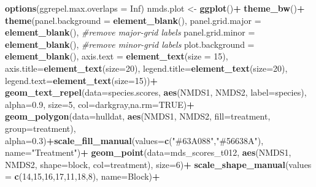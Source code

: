 \documentclass[
]{article}
\newenvironment{Shaded}{\begin{snugshade}}{\end{snugshade}}
\newcommand{\AttributeTok}[1]{\textcolor[rgb]{0.13,0.29,0.53}{#1}}
\newcommand{\CommentTok}[1]{\textcolor[rgb]{0.56,0.35,0.01}{\textit{#1}}}
\newcommand{\ConstantTok}[1]{\textcolor[rgb]{0.56,0.35,0.01}{#1}}
\newcommand{\DecValTok}[1]{\textcolor[rgb]{0.00,0.00,0.81}{#1}}
\newcommand{\FloatTok}[1]{\textcolor[rgb]{0.00,0.00,0.81}{#1}}
\newcommand{\FunctionTok}[1]{\textcolor[rgb]{0.13,0.29,0.53}{\textbf{#1}}}
\newcommand{\NormalTok}[1]{#1}
\newcommand{\OtherTok}[1]{\textcolor[rgb]{0.56,0.35,0.01}{#1}}
\newcommand{\SpecialCharTok}[1]{\textcolor[rgb]{0.81,0.36,0.00}{\textbf{#1}}}
\newcommand{\StringTok}[1]{\textcolor[rgb]{0.31,0.60,0.02}{#1}}
\begin{document}
\begin{Shaded}
\begin{Highlighting}[]
\FunctionTok{options}\NormalTok{(}\AttributeTok{ggrepel.max.overlaps =} \ConstantTok{Inf}\NormalTok{)}
\NormalTok{nmds.plot }\OtherTok{\textless{}{-}} \FunctionTok{ggplot}\NormalTok{()}\SpecialCharTok{+}
  \FunctionTok{theme\_bw}\NormalTok{()}\SpecialCharTok{+}
  \FunctionTok{theme}\NormalTok{(}\AttributeTok{panel.background =} \FunctionTok{element\_blank}\NormalTok{(),}
        \AttributeTok{panel.grid.major =} \FunctionTok{element\_blank}\NormalTok{(),  }\CommentTok{\#remove major{-}grid labels}
        \AttributeTok{panel.grid.minor =} \FunctionTok{element\_blank}\NormalTok{(),  }\CommentTok{\#remove minor{-}grid labels}
        \AttributeTok{plot.background =} \FunctionTok{element\_blank}\NormalTok{(), }
        \AttributeTok{axis.text =} \FunctionTok{element\_text}\NormalTok{(}\AttributeTok{size =} \DecValTok{15}\NormalTok{),}
        \AttributeTok{axis.title=}\FunctionTok{element\_text}\NormalTok{(}\AttributeTok{size=}\DecValTok{20}\NormalTok{),}
        \AttributeTok{legend.title=}\FunctionTok{element\_text}\NormalTok{(}\AttributeTok{size=}\DecValTok{20}\NormalTok{), }
        \AttributeTok{legend.text=}\FunctionTok{element\_text}\NormalTok{(}\AttributeTok{size=}\DecValTok{15}\NormalTok{))}\SpecialCharTok{+}
  \FunctionTok{geom\_text\_repel}\NormalTok{(}\AttributeTok{data=}\NormalTok{species.scores, }\FunctionTok{aes}\NormalTok{(NMDS1, NMDS2, }\AttributeTok{label=}\NormalTok{species), }\AttributeTok{alpha=}\FloatTok{0.9}\NormalTok{, }\AttributeTok{size=}\DecValTok{5}\NormalTok{, }\AttributeTok{col=}\StringTok{\textquotesingle{}darkgray\textquotesingle{}}\NormalTok{,}\AttributeTok{na.rm=}\ConstantTok{TRUE}\NormalTok{)}\SpecialCharTok{+}
  \FunctionTok{geom\_polygon}\NormalTok{(}\AttributeTok{data=}\NormalTok{hulldat, }\FunctionTok{aes}\NormalTok{(NMDS1, NMDS2, }\AttributeTok{fill=}\NormalTok{treatment, }\AttributeTok{group=}\NormalTok{treatment), }\AttributeTok{alpha=}\FloatTok{0.3}\NormalTok{)}\SpecialCharTok{+}\FunctionTok{scale\_fill\_manual}\NormalTok{(}\AttributeTok{values=}\FunctionTok{c}\NormalTok{(}\StringTok{"\#63A088"}\NormalTok{,}\StringTok{"\#56638A"}\NormalTok{), }\AttributeTok{name=}\StringTok{"Treatment"}\NormalTok{)}\SpecialCharTok{+}
  \FunctionTok{geom\_point}\NormalTok{(}\AttributeTok{data=}\NormalTok{mds\_scores\_t012, }\FunctionTok{aes}\NormalTok{(NMDS1, NMDS2, }\AttributeTok{shape=}\NormalTok{block, }\AttributeTok{col=}\NormalTok{treatment), }\AttributeTok{size=}\DecValTok{6}\NormalTok{)}\SpecialCharTok{+} \FunctionTok{scale\_shape\_manual}\NormalTok{(}\AttributeTok{values =} \FunctionTok{c}\NormalTok{(}\DecValTok{14}\NormalTok{,}\DecValTok{15}\NormalTok{,}\DecValTok{16}\NormalTok{,}\DecValTok{17}\NormalTok{,}\DecValTok{11}\NormalTok{,}\DecValTok{18}\NormalTok{,}\DecValTok{8}\NormalTok{), }\AttributeTok{name=}\StringTok{\textquotesingle{}Block\textquotesingle{}}\NormalTok{)}\SpecialCharTok{+}

\end{Highlighting}
\end{Shaded}
\end{document}
